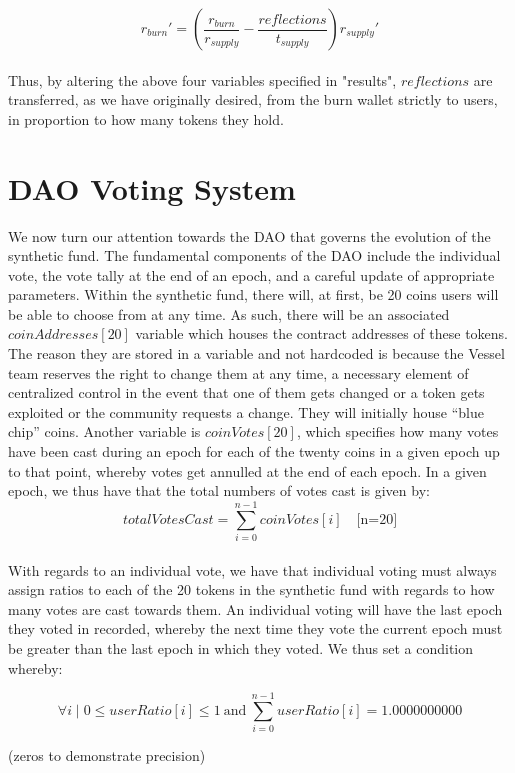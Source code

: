 \documentclass[letterpaper,11pt]{article}
\begin{document}
$$r_{burn}' = \left(\frac{r_{burn}}{r_{supply}}-\frac{reflections}{t_{supply}}\right)r_{supply}'$$\\


Thus, by altering the above four variables specified in "results", $reflections$ are transferred, as we have originally desired, from the burn wallet strictly to users, in proportion to how many tokens they hold.

\section{DAO Voting System}

We now turn our attention towards the DAO that governs the evolution of the synthetic fund. The fundamental components of the DAO include the individual vote, the vote tally at the end of an epoch, and a careful update of appropriate parameters. Within the synthetic fund, there will, at first, be 20 coins users will be able to choose from at any time. As such, there will be an associated $coinAddresses[20]$ variable which houses the contract addresses of these tokens. The reason they are stored in a variable and not hardcoded is because the Vessel team reserves the right to change them at any time, a necessary element of centralized control in the event that one of them gets changed or a token gets exploited or the community requests a change. They will initially house “blue chip” coins. Another variable is $coinVotes[20]$, which specifies how many votes have been cast during an epoch for each of the twenty coins in a given epoch up to that point, whereby votes get annulled at the end of each epoch. In a given epoch, we thus have that the total numbers of votes cast is given by:\\
$$totalVotesCast = \sum_{i=0}^{n-1}coinVotes[i]\quad \text{[n=20]}$$\\

With regards to an individual vote, we have that individual voting must always assign ratios to each of the 20 tokens in the synthetic fund with regards to how many votes are cast towards them. An individual voting will have the last epoch they voted in recorded, whereby the next time they vote the current epoch must be greater than the last epoch in which they voted. We thus set a condition whereby: 

$$\forall i \mid 0 \leq userRatio[i] \leq 1 \>\text{and}\> \sum_{i=0}^{n-1} userRatio[i] = 1.0000000000$$

(zeros to demonstrate precision)\\
\end{document}
